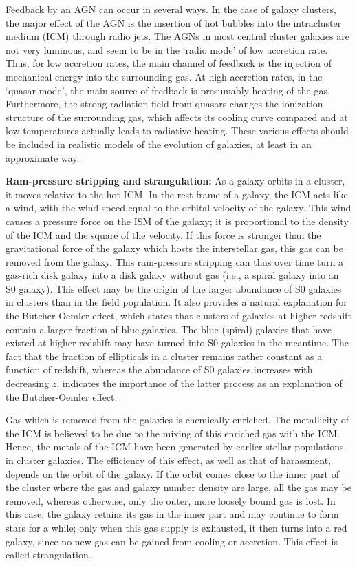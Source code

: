 \documentclass[a4paper,11pt]{article}
\begin{document}
{\noindent}Feedback by an AGN can occur in several ways. In the case of galaxy clusters, the major effect of the AGN is the insertion of hot bubbles into the intracluster medium (ICM) through radio jets. The AGNs in most central cluster galaxies are not very luminous, and seem to be in the `radio mode' of low accretion rate. Thus, for low accretion rates, the main channel of feedback is the injection of mechanical energy into the surrounding gas. At high accretion rates, in the `quasar mode', the main source of feedback is presumably heating of the gas. Furthermore, the strong radiation field from quasars changes the ionization structure of the surrounding gas, which affects its cooling curve compared and at low temperatures actually leads to radiative heating. These various effects should be included in realistic models of the evolution of galaxies, at least in an approximate way.

{\noindent}\textbf{Ram-pressure stripping and strangulation:} As a galaxy orbits in a cluster, it moves relative to the hot ICM. In the rest frame of a galaxy, the ICM acts like a wind, with the wind speed equal to the orbital velocity of the galaxy. This wind causes a pressure force on the ISM of the galaxy; it is proportional to the density of the ICM and the square of the velocity. If this force is stronger than the gravitational force of the galaxy which hosts the interstellar gas, this gas can be removed from the galaxy. This ram-pressure stripping can thus over time turn a gas-rich disk galaxy into a disk galaxy without gas (i.e., a spiral galaxy into an S0 galaxy). This effect may be the origin of the larger abundance of S0 galaxies in clusters than in the field population. It also provides a natural explanation for the Butcher-Oemler effect, which states that clusters of galaxies at higher redshift contain a larger fraction of blue galaxies. The blue (spiral) galaxies that have existed at higher redshift may have turned into S0 galaxies in the meantime. The fact that the fraction of ellipticals in a cluster remains rather constant as a function of redshift, whereas the abundance of S0 galaxies increases with decreasing $z$, indicates the importance of the latter process as an explanation of the Butcher-Oemler effect.

{\noindent}Gas which is removed from the galaxies is chemically enriched. The metallicity of the ICM is believed to be due to the mixing of this enriched gas with the ICM. Hence, the metals of the ICM have been generated by earlier stellar populations in cluster galaxies. The efficiency of this effect, as well as that of harassment, depends on the orbit of the galaxy. If the orbit comes close to the inner part of the cluster where the gas and galaxy number density are large, all the gas may be removed, whereas otherwise, only the outer, more loosely bound gas is lost. In this case, the galaxy retains its gas in the inner part and may continue to form stars for a while; only when this gas supply is exhausted, it then turns into a red galaxy, since no new gas can be gained from cooling or accretion. This effect is called strangulation.
\end{document}

